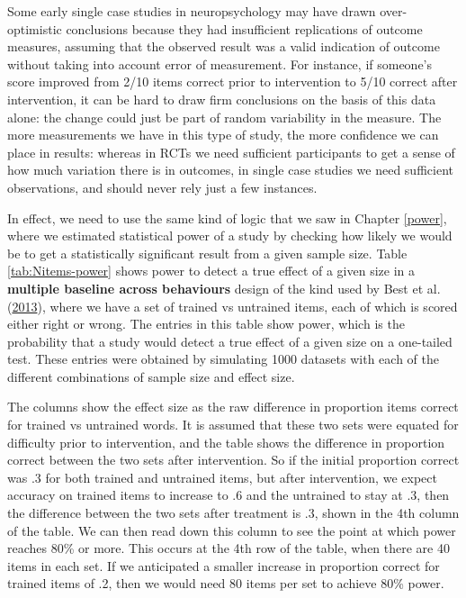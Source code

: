 \documentclass{krantz}
\begin{document}
Some early single case studies in neuropsychology may have drawn over-optimistic conclusions because they had insufficient replications of outcome measures, assuming that the observed result was a valid indication of outcome without taking into account error of measurement. For instance, if someone's score improved from 2/10 items correct prior to intervention to 5/10 correct after intervention, it can be hard to draw firm conclusions on the basis of this data alone: the change could just be part of random variability in the measure. The more measurements we have in this type of study, the more confidence we can place in results: whereas in RCTs we need sufficient participants to get a sense of how much variation there is in outcomes, in single case studies we need sufficient observations, and should never rely just a few instances.

In effect, we need to use the same kind of logic that we saw in Chapter \ref{power}, where we estimated statistical power of a study by checking how likely we would be to get a statistically significant result from a given sample size. Table \ref{tab:Nitems-power} shows power to detect a true effect of a given size in a \textbf{multiple baseline across behaviours} design of the kind used by Best et al. (\protect\hyperlink{ref-best2013}{2013}), where we have a set of trained vs untrained items, each of which is scored either right or wrong. The entries in this table show power, which is the probability that a study would detect a true effect of a given size on a one-tailed test. These entries were obtained by simulating 1000 datasets with each of the different combinations of sample size and effect size.

The columns show the effect size as the raw difference in proportion items correct for trained vs untrained words. It is assumed that these two sets were equated for difficulty prior to intervention, and the table shows the difference in proportion correct between the two sets after intervention. So if the initial proportion correct was .3 for both trained and untrained items, but after intervention, we expect accuracy on trained items to increase to .6 and the untrained to stay at .3, then the difference between the two sets after treatment is .3, shown in the 4th column of the table. We can then read down this column to see the point at which power reaches 80\% or more. This occurs at the 4th row of the table, when there are 40 items in each set. If we anticipated a smaller increase in proportion correct for trained items of .2, then we would need 80 items per set to achieve 80\% power.
\end{document}
